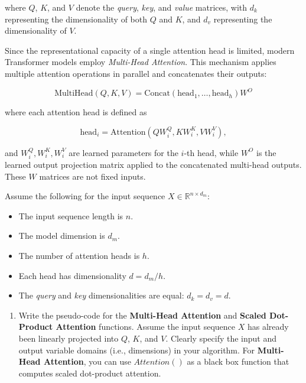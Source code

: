 \documentclass[12pt,a4paper]{article}
\theoremstyle{definition}
\begin{document}
\begin{enumerate}
    where $Q$, $K$, and $V$ denote the \textit{query}, \textit{key}, and \textit{value} matrices, with $d_k$ representing the dimensionality of both $Q$ and $K$, and $d_v$ representing the dimensionality of $V$.
    
    Since the representational capacity of a single attention head is limited, modern Transformer models employ \textit{Multi-Head Attention}. This mechanism applies multiple attention operations in parallel and concatenates their outputs:
    
    \begin{equation}
        \text{MultiHead}(Q, K, V) =
        \text{Concat}(\text{head}_1, \dots, \text{head}_h) W^O
    \end{equation}
    
    where each attention head is defined as
    
    \begin{equation}
        \text{head}_i = 
        \text{Attention}(QW_i^Q, KW_i^K, VW_i^V),
    \end{equation}
    
    and $W_i^Q, W_i^K, W_i^V$ are learned parameters for the $i$-th head, while $W^O$ is the learned output projection matrix applied to the concatenated multi-head outputs. These $W$ matrices are not fixed inputs.
    
    Assume the following for the input sequence \(X \in \mathbb{R}^{n \times d_m}\):
    \begin{itemize}
        \item The input sequence length is $n$.
        \item The model dimension is $d_{m}$.
        \item The number of attention heads is $h$.
        \item Each head has dimensionality $d = d_{m}/h$.
        \item The \textit{query} and \textit{key} dimensionalities are equal: $d_k = d_v = d$.
    \end{itemize}
        
    \begin{enumerate}
        \item Write the pseudo-code for the \textbf{Multi-Head Attention} and \textbf{Scaled Dot-Product Attention} functions. Assume the input sequence $X$ has already been linearly projected into $Q$, $K$, and $V$. Clearly specify the input and output variable domains (i.e., dimensions) in your algorithm. For \textbf{Multi-Head Attention}, you can use $Attention()$ as a black box function that computes scaled dot-product attention.


\end{enumerate}
\end{enumerate}
\end{document}

